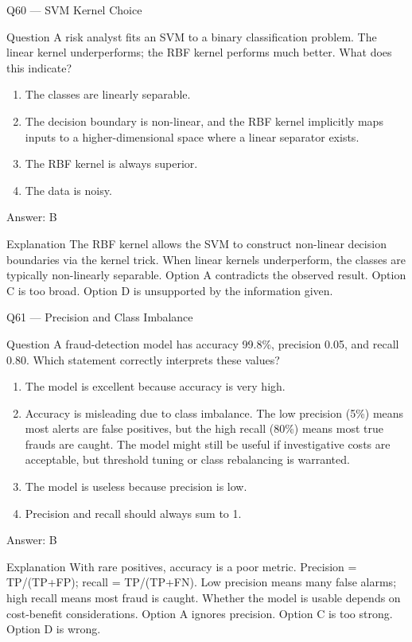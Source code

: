 \documentclass[aspectratio=169,8pt]{beamer}
\begin{document}
	\begin{frame}{Q60 --- SVM Kernel Choice}
		\begin{block}{Question}
			A risk analyst fits an SVM to a binary classification problem. The linear kernel underperforms; the RBF kernel performs much better. What does this indicate?
		\end{block}
		\begin{enumerate}
			\item The classes are linearly separable.
			\item The decision boundary is non-linear, and the RBF kernel implicitly maps inputs to a higher-dimensional space where a linear separator exists.
			\item The RBF kernel is always superior.
			\item The data is noisy.
		\end{enumerate}
		\begin{exampleblock}{Answer: B}\end{exampleblock}
		\begin{block}{Explanation}
			The RBF kernel allows the SVM to construct non-linear decision boundaries via the kernel trick. When linear kernels underperform, the classes are typically non-linearly separable. Option A contradicts the observed result. Option C is too broad. Option D is unsupported by the information given.
		\end{block}
	\end{frame}
	
	\begin{frame}{Q61 --- Precision and Class Imbalance}
		\begin{block}{Question}
			A fraud-detection model has accuracy 99.8\%, precision 0.05, and recall 0.80. Which statement correctly interprets these values?
		\end{block}
		\begin{enumerate}
			\item The model is excellent because accuracy is very high.
			\item Accuracy is misleading due to class imbalance. The low precision (5\%) means most alerts are false positives, but the high recall (80\%) means most true frauds are caught. The model might still be useful if investigative costs are acceptable, but threshold tuning or class rebalancing is warranted.
			\item The model is useless because precision is low.
			\item Precision and recall should always sum to 1.
		\end{enumerate}
		\begin{exampleblock}{Answer: B}\end{exampleblock}
		\begin{block}{Explanation}
			With rare positives, accuracy is a poor metric. Precision = TP/(TP+FP); recall = TP/(TP+FN). Low precision means many false alarms; high recall means most fraud is caught. Whether the model is usable depends on cost-benefit considerations. Option A ignores precision. Option C is too strong. Option D is wrong.
		\end{block}
	\end{frame}
	
\end{document}

